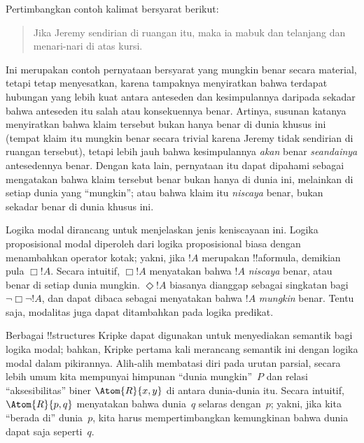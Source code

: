 \documentclass[../../../include/open-logic-section]{subfiles}
\begin{document}


Pertimbangkan contoh kalimat bersyarat berikut:
\begin{quote}
  Jika Jeremy sendirian di ruangan itu, maka ia mabuk dan telanjang dan
  menari-nari di atas kursi.
\end{quote}
Ini merupakan contoh pernyataan bersyarat yang mungkin benar secara material,
tetapi tetap menyesatkan, karena tampaknya menyiratkan bahwa terdapat hubungan
yang lebih kuat antara anteseden dan kesimpulannya daripada sekadar bahwa
anteseden itu salah atau konsekuennya benar. Artinya, susunan katanya
menyiratkan bahwa klaim tersebut bukan hanya benar di dunia khusus ini (tempat
klaim itu mungkin benar secara trivial karena Jeremy tidak sendirian di
ruangan tersebut), tetapi lebih jauh bahwa kesimpulannya \emph{akan} benar
\emph{seandainya} antesedennya benar. Dengan kata lain, pernyataan itu dapat
dipahami sebagai mengatakan bahwa klaim tersebut benar bukan hanya di dunia
ini, melainkan di setiap dunia yang ``mungkin''; atau bahwa klaim itu
\emph{niscaya} benar, bukan sekadar benar di dunia khusus ini.

Logika modal dirancang untuk menjelaskan jenis keniscayaan ini. Logika
proposisional modal diperoleh dari logika proposisional biasa dengan
menambahkan operator kotak; yakni, jika $!A$ merupakan !!a{formula}, demikian
pula $\Box !A$. Secara intuitif, $\Box !A$ menyatakan
bahwa $!A$ \emph{niscaya} benar, atau benar di setiap dunia mungkin.
$\Diamond !A$ biasanya dianggap sebagai singkatan bagi $\lnot \Box \lnot
!A$, dan dapat dibaca sebagai menyatakan bahwa $!A$ \emph{mungkin} benar.
Tentu saja, modalitas juga dapat ditambahkan pada logika predikat.

Berbagai !!{structure}s Kripke dapat digunakan untuk menyediakan semantik bagi logika
modal; bahkan, Kripke pertama kali merancang semantik ini dengan logika modal
dalam pikirannya. Alih-alih membatasi diri pada urutan parsial, secara lebih
umum kita mempunyai himpunan ``dunia mungkin''~$P$ dan relasi
``aksesibilitas'' biner $\Atom{R}{x,y}$ di antara dunia-dunia itu. Secara
intuitif, $\Atom{R}{p,q}$ menyatakan bahwa dunia~$q$ selaras dengan~$p$;
yakni, jika kita ``berada di'' dunia~$p$, kita harus mempertimbangkan
kemungkinan bahwa dunia dapat saja seperti~$q$.
\end{document}
